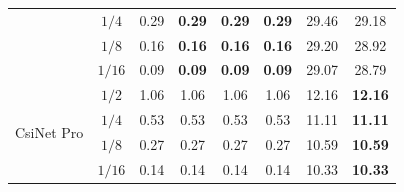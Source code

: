 \begin{table}[htb]
\begin{tabular}{|cc|cccc|cc|}
\multicolumn{1}{|c|}{}                            & $1/4$  & \multicolumn{1}{c|}{0.29}          & \multicolumn{1}{c|}{\textbf{0.29}} & \multicolumn{1}{c|}{\textbf{0.29}} & \textbf{0.29} & \multicolumn{1}{c|}{29.46}         & 29.18          \\ \cline{2-8} 
\multicolumn{1}{|c|}{}                            & $1/8$  & \multicolumn{1}{c|}{0.16}          & \multicolumn{1}{c|}{\textbf{0.16}} & \multicolumn{1}{c|}{\textbf{0.16}} & \textbf{0.16} & \multicolumn{1}{c|}{29.20}         & 28.92          \\ \cline{2-8} 
\multicolumn{1}{|c|}{}                            & $1/16$ & \multicolumn{1}{c|}{0.09}          & \multicolumn{1}{c|}{\textbf{0.09}} & \multicolumn{1}{c|}{\textbf{0.09}} & \textbf{0.09} & \multicolumn{1}{c|}{29.07}         & 28.79          \\ \hline
\multicolumn{1}{|c|}{\multirow{4}{*}{CsiNet Pro}} & $1/2$  & \multicolumn{1}{c|}{1.06}          & \multicolumn{1}{c|}{1.06}          & \multicolumn{1}{c|}{1.06}          & 1.06          & \multicolumn{1}{c|}{12.16}         & \textbf{12.16} \\ \cline{2-8} 
\multicolumn{1}{|c|}{}                            & $1/4$  & \multicolumn{1}{c|}{0.53}          & \multicolumn{1}{c|}{0.53}          & \multicolumn{1}{c|}{0.53}          & 0.53          & \multicolumn{1}{c|}{11.11}         & \textbf{11.11} \\ \cline{2-8} 
\multicolumn{1}{|c|}{}                            & $1/8$  & \multicolumn{1}{c|}{0.27}          & \multicolumn{1}{c|}{0.27}          & \multicolumn{1}{c|}{0.27}          & 0.27          & \multicolumn{1}{c|}{10.59}         & \textbf{10.59} \\ \cline{2-8} 
\multicolumn{1}{|c|}{}                            & $1/16$ & \multicolumn{1}{c|}{0.14}          & \multicolumn{1}{c|}{0.14}          & \multicolumn{1}{c|}{0.14}          & 0.14          & \multicolumn{1}{c|}{10.33}         & \textbf{10.33} \\ \hline
\end{tabular}
\end{table}
